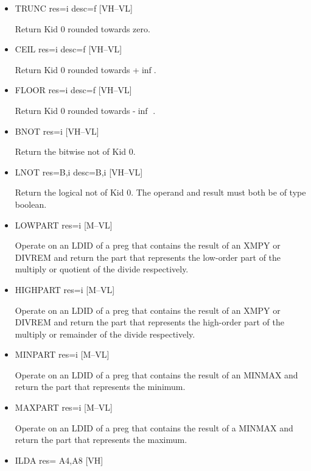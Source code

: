 \documentclass{article}
\begin{document}
\begin{itemize}
\item
{}%
TRUNC res=i desc=f \hfill [VH--VL]

Return Kid 0 rounded towards zero.

\item
{}%
CEIL res=i desc=f \hfill [VH--VL]

Return Kid 0 rounded towards +$\inf$.


\item
{}%
FLOOR res=i desc=f \hfill [VH--VL]

Return Kid 0 rounded towards -$\inf$ .

\item
{}%
BNOT res=i \hfill [VH--VL]

Return the bitwise not of Kid 0.

\item
{}%
LNOT res=B,i desc=B,i \hfill [VH--VL]

Return the logical not of Kid 0. The operand and result must both
be of type boolean.

\item
{}%
LOWPART res=i \hfill [M--VL]

Operate on an
%
LDID of a preg that contains the result of an
%
%
XMPY
or
%
DIVREM and return the part that represents the low-order part
of the multiply or quotient of the divide respectively.

\item
{}%
HIGHPART res=i \hfill [M--VL]

Operate on an
%
LDID of a preg that contains the result of an
%
%
XMPY
or
%
DIVREM and return the part that represents the high-order part
of the multiply or remainder of the divide respectively.

\item
{}%
MINPART res=i \hfill [M--VL]

Operate on an
%
LDID of a preg that contains the result of an
%
MINMAX
and return the part that represents the minimum.

\item
{}%
MAXPART res=i \hfill [M--VL]

Operate on an
%
LDID of a preg that contains the result of a
%
MINMAX
and return the part that represents the maximum.

\item
{}%
ILDA res= A4,A8 \hfill [VH]


\end{itemize}
\end{document}
